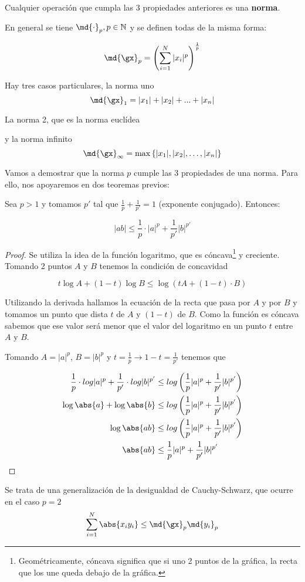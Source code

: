 \documentclass{apuntes}
\begin{document}
\begin{defn}[Norma]
Cualquier operación que cumpla las 3 propiedades anteriores es una \textbf{norma}.

En general se tiene $\md{\cdot}_p, p \in \mathbb{N}$ y se definen todas de la misma forma:

\[ \md{\gx}_p = \left(\sum_{i=1}^N |x_i|^p \right)^\frac{1}{p} \]

\end{defn}

Hay tres casos particulares, la norma uno 
\[ \md{\gx}_1 = |x_1| + |x_2| + ... + |x_n| \]

La norma 2, que es la norma euclídea

y la norma infinito 
\[\md{\gx}_{\infty} = \max\left\{|x_1|,|x_2|,\dots,|x_n|\right\} \]

 Vamos a demostrar que la norma $p$ cumple las 3 propiedades de una norma. Para ello, nos apoyaremos en dos teoremas previos:

\begin{theorem}
 Sea $p > 1$ y tomamos $p'$ tal que $\frac{1}{p}+\frac{1}{p'} = 1$ (exponente conjugado). Entonces:

\[ |ab| \leq \frac{1}{p} \cdot |a|^p +\frac{1}{p'} |b| ^ {p'} \]
\end{theorem}
 
\begin{proof}
Se utiliza la idea de la función logaritmo, que es cóncava\footnote{Geométricamente, cóncava significa que si uno 2 puntos de la gráfica, la recta que los une queda debajo de la gráfica.} y creciente.  Tomando 2 puntos $A$ y $B$ tenemos la condición de concavidad 

\[ t \log A + (1-t) \log B \leq \log (tA + (1-t) \cdot B)\]

Utilizando la derivada hallamos la ecuación de la recta que pasa por $A$ y por $B$ y tomamos un punto que dista $t$ de $A$ y $(1-t)$ de $B$. Como la función es cóncava sabemos que ese valor será menor que el valor del logaritmo en un punto $t$ entre $A$ y $B$.

Tomando $A=|a| ^ p$, $B = |b| ^ p$ y $t = \frac{1}{p} \rightarrow 1-t = \frac{1}{p'}$ tenemos que

\begin{align*}
\frac{1}{p}\cdot log |a|^p + \frac{1}{p'} \cdot log|b|^{p'} &\leq log\left(\frac{1}{p}|a|^p + \frac{1}{p'} |b|^{p'}\right) \\
\log \abs{a} + \log \abs{b} &\leq log\left(\frac{1}{p}|a|^p + \frac{1}{p'} |b|^{p'}\right) \\
\log \abs{ab} &\leq log\left(\frac{1}{p}|a|^p + \frac{1}{p'} |b|^{p'}\right) \\
\abs{ab} &\leq \frac{1}{p}|a|^p + \frac{1}{p'} |b|^{p'} 
\end{align*}
\end{proof} 
\begin{theorem} Se trata de una generalización de la desigualdad de Cauchy-Schwarz, que ocurre en el caso $p=2$
\[ \sum_{i=1} ^ N \abs{x_i y_i} \leq \md{\gx}_p \md{y_i}_p \]
\label{thmHolder}
\end{theorem}
\end{document}
